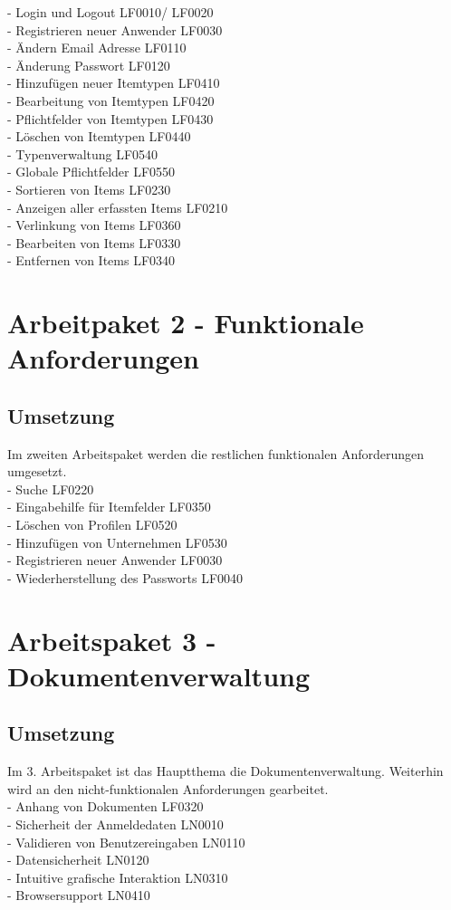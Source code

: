 \documentclass[11pt,a4paper]{report}
\begin{document}
- Login und Logout LF0010/ LF0020 \\
- Registrieren neuer Anwender LF0030 \\ 
- Ändern Email Adresse LF0110 \\
- Änderung Passwort LF0120 \\
- Hinzufügen neuer Itemtypen LF0410\\
- Bearbeitung von Itemtypen LF0420\\
- Pflichtfelder von Itemtypen LF0430\\
- Löschen von Itemtypen LF0440\\
- Typenverwaltung LF0540\\
- Globale Pflichtfelder LF0550\\
- Sortieren von Items LF0230\\
- Anzeigen aller erfassten Items LF0210\\
- Verlinkung von Items LF0360\\
- Bearbeiten von Items LF0330\\
- Entfernen von Items LF0340\\

\section{Arbeitpaket 2 - Funktionale Anforderungen }
\subsection{Umsetzung}
Im zweiten Arbeitspaket werden die restlichen funktionalen Anforderungen umgesetzt.\\
- Suche LF0220\\
- Eingabehilfe für Itemfelder LF0350\\
- Löschen von Profilen LF0520\\
- Hinzufügen von Unternehmen LF0530\\
- Registrieren neuer Anwender LF0030\\
- Wiederherstellung des Passworts LF0040\\

\newpage

\section{Arbeitspaket 3 - Dokumentenverwaltung}
\subsection{Umsetzung}
Im 3. Arbeitspaket ist das Hauptthema die Dokumentenverwaltung. Weiterhin wird an den nicht-funktionalen Anforderungen gearbeitet. \\
- Anhang von Dokumenten LF0320\\
- Sicherheit der Anmeldedaten LN0010\\
- Validieren von Benutzereingaben LN0110\\
- Datensicherheit LN0120\\
- Intuitive grafische Interaktion LN0310\\
- Browsersupport LN0410\\
\end{document}
